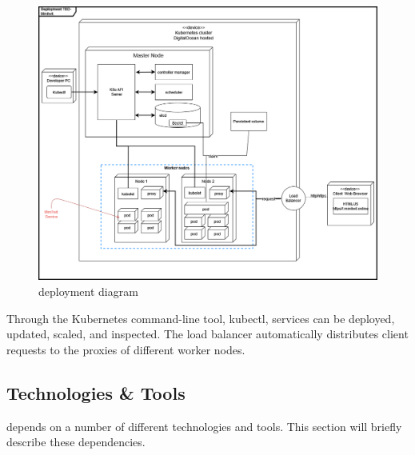 \begin {figure}[H]
    \centering
    \includegraphics[scale=0.45]{images/deployment_diagrams/devopsdiagrams-deployment k8s.drawio(1).png}
    \caption{\mini deployment diagram}
    \label{fig:figdeploy}
\end{figure}
Through the Kubernetes command-line tool, kubectl, services can be deployed, updated, scaled, and inspected. The load balancer automatically distributes client requests to the proxies of different worker nodes.

\subsection{Technologies \& Tools}
\label{subsec:techs}
\mini depends on a number of different technologies and tools. This section will briefly describe these dependencies.\\


